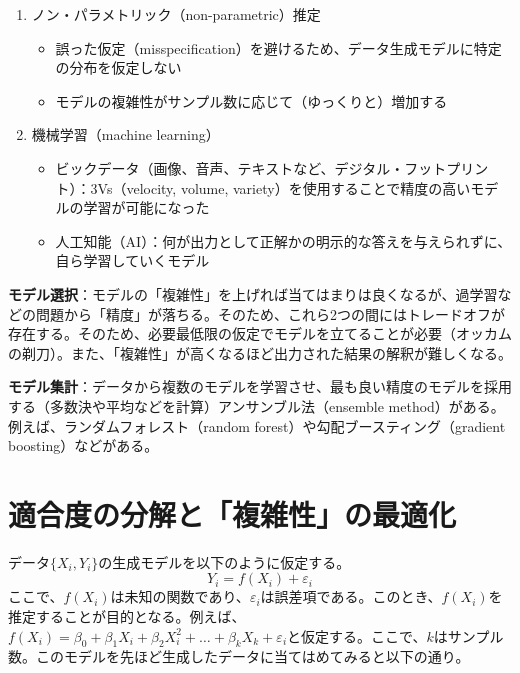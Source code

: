 \documentclass[
  pandoc,
  jafont=haranoaji]{bxjsarticle}
\providecommand{\tightlist}{%
  \setlength{\itemsep}{0pt}\setlength{\parskip}{0pt}}
\begin{document}
\begin{enumerate}
\def\labelenumi{\arabic{enumi}.}
\item
  ノン・パラメトリック（non-parametric）推定

  \begin{itemize}
  \tightlist
  \item
    誤った仮定（misspecification）を避けるため、データ生成モデルに特定の分布を仮定しない
  \item
    モデルの複雑性がサンプル数に応じて（ゆっくりと）増加する
  \end{itemize}
\item
  機械学習（machine learning）

  \begin{itemize}
  \tightlist
  \item
    ビックデータ（画像、音声、テキストなど、デジタル・フットプリント）：3Vs（velocity,
    volume,
    variety）を使用することで精度の高いモデルの学習が可能になった
  \item
    人工知能（AI）：何が出力として正解かの明示的な答えを与えられずに、自ら学習していくモデル
  \end{itemize}
\end{enumerate}

\textbf{モデル選択}：モデルの「複雑性」を上げれば当てはまりは良くなるが、過学習などの問題から「精度」が落ちる。そのため、これら2つの間にはトレードオフが存在する。そのため、必要最低限の仮定でモデルを立てることが必要（オッカムの剃刀）。また、「複雑性」が高くなるほど出力された結果の解釈が難しくなる。

\textbf{モデル集計}：データから複数のモデルを学習させ、最も良い精度のモデルを採用する（多数決や平均などを計算）アンサンブル法（ensemble
method）がある。例えば、ランダムフォレスト（random
forest）や勾配ブースティング（gradient boosting）などがある。

\hypertarget{ux9069ux5408ux5ea6ux306eux5206ux89e3ux3068ux8907ux96d1ux6027ux306eux6700ux9069ux5316}{%
\section{適合度の分解と「複雑性」の最適化}\label{ux9069ux5408ux5ea6ux306eux5206ux89e3ux3068ux8907ux96d1ux6027ux306eux6700ux9069ux5316}}

データ\(\{X_i, Y_i\}\)の生成モデルを以下のように仮定する。 \[
Y_i = f(X_i) + \varepsilon_i
\]
ここで、\(f(X_i)\)は未知の関数であり、\(\varepsilon_i\)は誤差項である。このとき、\(f(X_i)\)を推定することが目的となる。例えば、\(f(X_i) = \beta_0 + \beta_1 X_i + \beta_2 X_i^2 + \ldots + \beta_k X_k + \varepsilon_i\)と仮定する。ここで、\(k\)はサンプル数。このモデルを先ほど生成したデータに当てはめてみると以下の通り。
\end{document}
